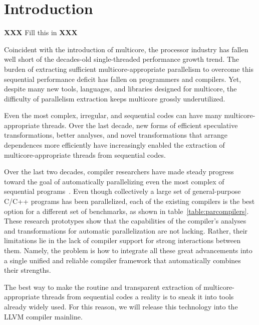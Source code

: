 \section{Introduction}

\textbf{XXX} Fill this in \textbf{XXX}



Coincident with the introduction of multicore, the processor industry has
fallen well short of the decades-old single-threaded performance growth
trend. The burden of extracting sufficient multicore-appropriate parallelism
to overcome this sequential performance deficit has fallen on programmers
and compilers. Yet, despite many new tools, languages, and libraries
designed for multicore, the difficulty of parallelism extraction keeps
multicore grossly underutilized.

Even the most complex, irregular, and sequential codes can have many
multicore-appropriate threads.  Over the last decade, new forms of efficient
speculative transformations, better analyses, and novel transformations that
arrange dependences more efficiently have increasingly enabled the
extraction of multicore-appropriate threads from sequential codes.

Over the last two decades, compiler researchers have made steady progress
toward the goal of automatically parallelizing even the most complex of
sequential programs~\cite{Campanoni:2012:HAP:2259016.2259028,
johnson:12:pldi, kim:12:cgo, kim:10:micro, raman:10:asplos,
ottoni:05:micro, raman:cgo:08, malhke-doall paper, johnson:17:cgo}.
%
Even though collectively a large set of general-purpose C/C++ programs has
been parallelized, each of the existing compilers is the best option for a
different set of benchmarks, as shown in table~\ref{table:parcompilers}.
%
These research prototypes show that the capabilities of the compiler's
analyses and transformations for automatic parallelization are not lacking.
Rather, their limitations lie in the lack of compiler support for strong
interactions between them.
%
Namely, the problem is how to integrate all these great advancements into a
single unified and reliable compiler framework that automatically combines
their strengths.

The best way to make the routine and transparent extraction of
multicore-appropriate threads from sequential codes a reality is to sneak it
into tools already widely used.  For this reason, we will release this
technology into the LLVM compiler mainline.

